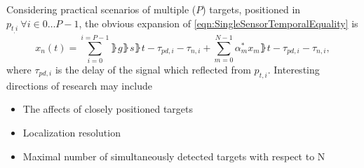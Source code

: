 Considering practical scenarios of multiple ($P$) targets, positioned in $p_{t_,i}\ \forall i\in0\dots{}P-1$, the obvious expansion of \eqref{eqn:SingleSensorTemporalEquality} is 
\begin{equation}
    \label{eqn:ftr_dyn_temp}
    x_{n}(t) = \sum_{i=0}^{i=P-1}{\rBrace{g\rBrace{s\rBrace{t-\tau_{pd,i}-\tau_{n,i}}
    +\sum_{m=0}^{N-1}{\alpha^{*}_{m}x_{m}\rBrace{t-\tau_{pd,i}-\tau_{n,i}}}}}},
\end{equation}
where $\tau_{pd,i}$ is the delay of the signal which reflected from $p_{t,i}$.
Interesting directions of research may include
\begin{itemize}
    \item The affects of closely positioned targets
    \item Localization resolution
    \item Maximal number of simultaneously detected targets with respect to N
\end{itemize}